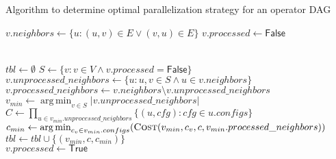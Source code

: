 \documentclass{article}
\DeclareMathOperator*{\argmin}{arg\,min}
\newcommand{\true}{\textsf{True}}
\newcommand{\false}{\textsf{False}}
\begin{document}
\begin{algorithm}
\caption{\label{alg:dp}Algorithm to determine optimal parallelization
strategy for an operator DAG}

\begin{algorithmic}[1]

		\State $v.neighbors \leftarrow  \{u: (u,v) \in E \lor (v,u) \in E\}$
		\State $v.processed \leftarrow \false$
	\EndFor

	\\

	\State $tbl \leftarrow \emptyset$
	\While{$\exists x \in V: x.processed = \false$}
		\State $S \leftarrow \{v: v\in V \land v.processed = \false\}$ 
		\\
			\State $v.unprocessed\_neighbors \leftarrow \{u: u, v\in S \land u\in v.neighbors\}$
			\State $v.processed\_neighbors \leftarrow v.neighbors \setminus
			v.unprocessed\_neighbors$
		\EndFor
		\State $v_{min} \leftarrow \argmin_{v\in S} |v.unprocessed\_neighbors|$
		\\

		\State $C \leftarrow \prod_{u\in v_{min}.unprocessed\_neighbors} \{(u,
		cfg): cfg \in u.configs\}$
		\\

			\State $c_{min} \leftarrow \argmin_{c_v \in v_{min}.configs}
			(\Call{Cost}{v_{min}, c_v, c, v_{min}.processed\_neighbors})$
			\State $tbl \leftarrow tbl \cup \{(v_{min}, c, c_{min})\}$
		\EndFor
		\\


		\State $v.processed \leftarrow \true$
	\EndWhile
	\\
	\\

	\EndProcedure
\end{algorithmic}

\end{algorithm}
\end{document}
